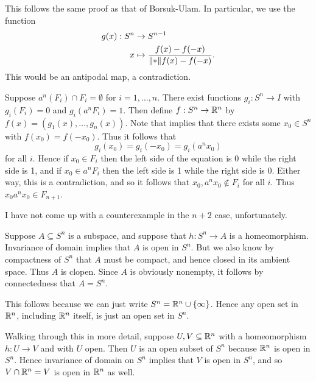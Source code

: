 \documentclass[../../solutions.tex]{subfiles}
\begin{document}
\begin{exercise} \leavevmode
This follows the same proof as that of Borsuk-Ulam.
In particular, we use the function
\begin{align*}
g(x):S^n&\to S^{n-1} \\
x&\mapsto\frac{f(x)-f(-x)}{\lVert*\rVert{f(x)-f(-x)}}.
\end{align*}
This would be an antipodal map, a contradiction.
\end{exercise}

\begin{exercise} \leavevmode
Suppose $a^n(F_i)\cap F_i=\emptyset$ for $i=1,\dots,n$.
There exist functions $g_i:S^n\to I$ with $g_i(F_i)=0$ and $g_i(a^nF_i)=1$.
Then define $f:S^n\to\mathbb{R}^n$ by $f(x)=(g_1(x),\dots,g_n(x))$.
Note that  implies that there exists some $x_0\in S^n$ with $f(x_0)=f(-x_0)$.
Thus it follows that \[g_i(x_0)=g_i(-x_0)=g_i(a^nx_0)\] for all $i$.
Hence if $x_0\in F_i$ then the left side of the equation is 0 while the right side is 1, and if $x_0\in a^nF_i$ then the left side is 1 while the right side is 0.
Either way, this is a contradiction, and so it follows that $x_0,a^nx_0\not\in F_i$ for all $i$.
Thus $x_0a^nx_0\in F_{n+1}$.

I have not come up with a counterexample in the $n+2$ case, unfortunately.
\end{exercise}

\begin{exercise} \leavevmode
Suppose $A\subseteq S^n$ is a subspace, and suppose that $h:S^n\to A$ is a homeomorphism.
Invariance of domain implies that $A$ is open in $S^n$.
But we also know by compactness of $S^n$ that $A$ must be compact, and hence closed in its ambient space.
Thus $A$ is clopen.
Since $A$ is obviously nonempty, it follows by connectedness that $A=S^n$.
\end{exercise}

\begin{exercise} \leavevmode
This follows because we can just write $S^n=\mathbb{R}^n\cup\{\infty\}$.
Hence any open set in $\mathbb{R}^n$, including $\mathbb{R}^n$ itself, is just an open set in $S^n$.

Walking through this in more detail, suppose $U,V\subseteq\mathbb{R}^n$ with a homeomorphism $h:U\to V$ and with $U$ open.
Then $U$ is an open subset of $S^n$ because $\mathbb{R}^n$ is open in $S^n$.
Hence invariance of domain on $S^n$ implies that $V$ is open in $S^n$, and so $V\cap\mathbb{R}^n=V$ is open in $\mathbb{R}^n$ as well.
\end{exercise}
\end{document}
